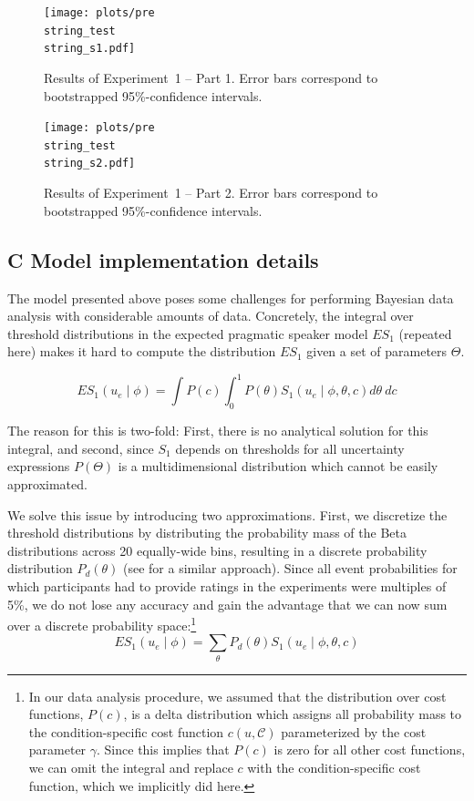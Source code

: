 \documentclass[man, floatsintext]{apa6}
\begin{document}
\begin{figure}[h!]
\texttt{[image: plots/pre\\string\_test\\string\_s1.pdf]}
\caption{Results of Experiment~1 -- Part 1. Error bars correspond to bootstrapped 95\%-confidence intervals. \label{fig:norming-results-1}}
\end{figure}

\begin{figure}[h!]
\texttt{[image: plots/pre\\string\_test\\string\_s2.pdf]}
\caption{Results of Experiment~1  -- Part 2. Error bars correspond to bootstrapped 95\%-confidence intervals. \label{fig:norming-results-2}}
\vspace{4cm}

\end{figure}


\pagebreak
\FloatBarrier

\subsection*{C Model implementation details}

The model presented above poses some challenges for performing Bayesian data analysis with considerable amounts of data. 
Concretely, the integral over threshold distributions in the expected pragmatic speaker model $ES_1$ (repeated here) makes it hard to compute 
the distribution $ES_1$ given a set of parameters $\Theta$.

$$ES_1\left(u_e \mid \phi \right) = \int P(c) \int_0^1 P(\theta) S_1\left(u _e\mid \phi, \theta, c\right) d\theta \  d c$$

The reason for this is two-fold: First, there is no analytical solution for this integral, and second, since $S_1$ depends on
thresholds for all uncertainty expressions $P(\Theta)$ is a multidimensional distribution which cannot be easily approximated.

We solve this issue by introducing two approximations. First, we discretize the threshold distributions by distributing the probability mass
of the Beta distributions across 20 equally-wide bins, resulting in a discrete probability distribution $P_{d}(\theta)$ (see \cite{Tessler2019} for a similar approach). Since all event probabilities for which participants had to provide ratings in the
experiments were multiples of 5\%, we do not lose any accuracy and gain the advantage that we can now sum over a discrete probability space:\footnote{In our data analysis procedure, we assumed that the 
distribution over cost functions, $P(c)$, is a delta distribution which assigns all probability mass to the condition-specific cost function 
$c(u, \mathscr{C})$ parameterized by the cost parameter $\gamma$. Since this implies that $P(c)$ is zero for all other cost functions, we can omit the integral and replace $c$ 
with the condition-specific cost function, which we implicitly did here.}
$$ES_1\left(u_e \mid \phi \right) = \sum_{\theta} P_{d}(\theta) S_1\left(u _e\mid \phi, \theta, c\right)$$
\end{document}
